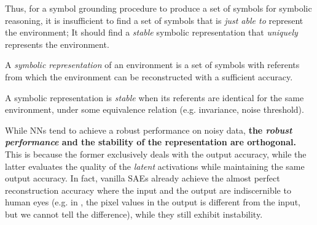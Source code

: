 Thus, for a symbol grounding procedure to produce a set of symbols for symbolic reasoning,
it is insufficient to find a set of symbols that is \emph{just able to} represent the environment;
It should find a \emph{stable} symbolic representation that \emph{uniquely} represents the environment.

\begin{defi}
A \emph{symbolic representation} of an environment is a set of symbols with referents
from which the environment can be reconstructed with a sufficient accuracy.
\end{defi}

\begin{defi}
A symbolic representation is \emph{stable} when its referents are identical
for the same environment, under some equivalence relation (e.g. invariance, noise threshold).
\end{defi}



While NNs tend to achieve a robust performance on noisy data,
\textbf{the \emph{robust performance} and the stability of the representation are orthogonal.}
This is because the former exclusively deals with the output accuracy,
while the latter evaluates the quality of the \emph{latent} activations while maintaining the same output accuracy.
In fact, vanilla SAEs already achieve the almost perfect reconstruction accuracy
where the input and the output are indiscernible to human eyes
(e.g. in , the pixel values in the output is different from the input, but we cannot tell the difference),
while they still exhibit instability.

